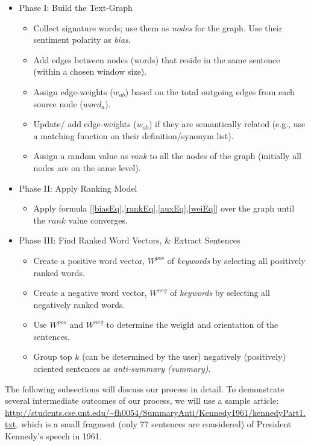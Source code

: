 \documentclass[a4paper]{report}
\begin{document}
\begin{itemize}
\item Phase I: Build the Text-Graph
\begin{small}
\begin{itemize}
\item Collect signature words; use them as \emph{nodes} for the graph.  Use their sentiment polarity as \emph{bias}.
\item Add edges between nodes (words) that reside in the same sentence (within a chosen window size).
\item Assign edge-weights ($w_{ab}$) based on the total outgoing edges from each source node ($word_a$).
\item Update/ add edge-weights ($w_{ab}$) if they are semantically related (e.g., use a matching function on their definition/synonym list).
\item Assign a random value as \emph{rank} to all the nodes of the graph (initially all nodes are on the same level).
\end{itemize}\end{small}
\item Phase II: Apply Ranking Model
\begin{small}
\begin{itemize}
\item  Apply formula [\ref{biasEq},\ref{rankEq},\ref{auxEq},\ref{weiEq}] over the graph until the $rank$ value converges.
\end{itemize}
\end{small}
\item Phase III: Find Ranked Word Vectors, \& Extract Sentences
\begin{small}
\begin{itemize}
\item Create a positive word vector, $W^{pos}$ of {\em keywords} by selecting all positively ranked words.
\item Create a negative word vector, $W^{neg}$ of {\em keywords} by selecting all negatively ranked words.
\item Use $W^{pos}$ and $W^{neg}$ to determine the weight and orientation of the sentences.
\item Group top $k$ (can be determined by the user) negatively (positively) oriented sentences as {\em anti-summary (summary)}.
\end{itemize}
\end{small}
\end{itemize}
\vspace{-.1in}
\par The following subsections will discuss our process in detail. To demonstrate several intermediate  outcomes of our 
process, we will use a sample article: \url{http://students.cse.unt.edu/~fh0054/SummaryAnti/Kennedy1961/kennedyPart1.txt}, 
which is a small fragment (only 77 sentences are considered) of President Kennedy's speech in 1961.
\vspace{-.1in}
\end{document}
